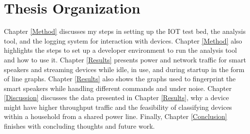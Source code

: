 \section{Thesis Organization}
Chapter \ref{Method} discusses my steps in setting up the IOT test bed, the analysis tool, and the logging system for interaction with devices. Chapter \ref{Method} also highlights the steps to set up a developer environment to run the analysis tool and how to use it. Chapter \ref{Results} presents power and network traffic for smart speakers and streaming devices while idle, in use, and during startup in the form of line graphs. Chapter \ref{Results} also shows the graphs used to fingerprint the smart speakers while handling different commands and under noise. Chapter \ref{Discussion} discusses the data presented in Chapter \ref{Results}, why a device might have higher throughput traffic and the feasibility of classifying devices within a household from a shared power line. Finally, Chapter \ref{Conclusion} finishes with concluding thoughts and future work.
